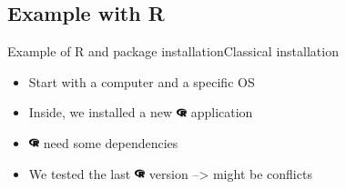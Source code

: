 \subsection{Example with R}
\begin{frame}{Example of R and package installation}{Classical installation}
\begin{itemize}[<+->]
	\item Start with a computer and a specific OS
	\item Inside, we installed a new \includegraphics[width=0.3cm, height=0.3cm]{images/r-project.pdf} application
	\item \includegraphics[width=0.3cm, height=0.3cm]{images/r-project.pdf} need some dependencies
	\item We tested the last  \includegraphics[width=0.3cm, height=0.3cm]{images/r-project.pdf} version --> might be conflicts
\end{itemize}

\end{frame}

